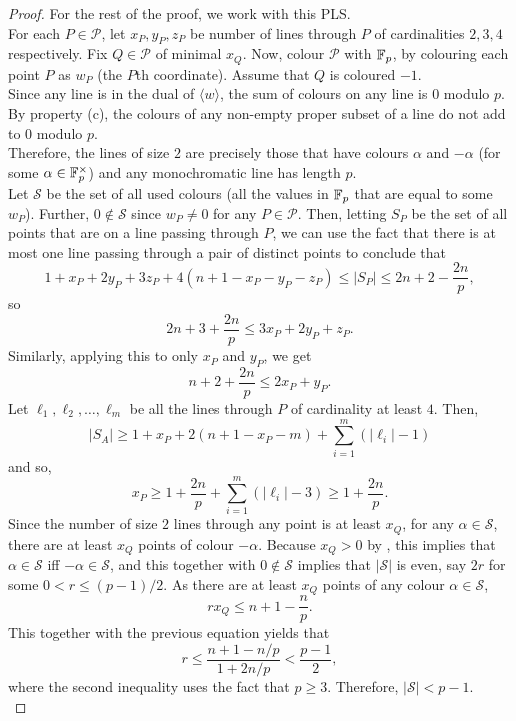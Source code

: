 \begin{proof}
		For the rest of the proof, we work with this PLS.\\
		For each $P \in \mathcal{P}$, let $x_P,y_P,z_P$ be number of lines through $P$ of cardinalities $2,3,4$ respectively. Fix $Q \in \mathcal{P}$ of minimal $x_Q$. Now, colour $\mathcal{P}$ with $\mathbb{F}_p$, by colouring each point $P$ as $w_P$ (the $P$th coordinate). Assume that $Q$ is coloured $-1$.\\
		Since any line is in the dual of $\langle w \rangle$, the sum of colours on any line is $0$ modulo $p$.\\
		By property (c), the colours of any non-empty proper subset of a line do not add to $0$ modulo $p$.\\
		Therefore, the lines of size $2$ are precisely those that have colours $\alpha$ and $-\alpha$ (for some $\alpha \in \mathbb{F}_p^\times$) and any monochromatic line has length $p$.\\
		Let $\mathcal{S}$ be the set of all used colours (all the values in $\mathbb{F}_p$ that are equal to some $w_P$). Further, $0 \not\in \mathcal{S}$ since $w_P \ne 0$ for any $P \in \mathcal{P}$. Then, letting $S_P$ be the set of all points that are on a line passing through $P$, we can use the fact that there is at most one line passing through a pair of distinct points to conclude that
		\[ 1 + x_P + 2 y_P + 3 z_P + 4(n+1 - x_P - y_P - z_P) \le |S_P| \le 2n+2-\frac{2n}{p}, \]
		so
		\begin{equation}
			\label{eqn: xP yP zP joint bound}
			2n+3+\frac{2n}{p} \le 3 x_P + 2 y_P + z_P.
		\end{equation}
		Similarly, applying this to only $x_P$ and $y_P$, we get
		\begin{equation}
			\label{eqn: xP yP joint bound}
			n+2+\frac{2n}{p} \le 2x_P + y_P.
		\end{equation}
		Let $\ell_1,\ell_2,\ldots,\ell_m$ be all the lines through $P$ of cardinality at least $4$. Then,
		\[ |S_A| \ge 1 + x_P + 2(n+1 - x_P - m) + \sum_{i = 1}^{m} (|\ell_i| - 1) \]
		and so,
		\begin{equation}
			\label{eqn: xP line bound}
			x_P \ge 1 + \frac{2n}{p} + \sum_{i=1}^{m} (|\ell_i| - 3) \ge 1 + \frac{2n}{p}.	
		\end{equation}
		Since the number of size $2$ lines through any point is at least $x_Q$, for any $\alpha \in \mathcal{S}$, there are at least $x_Q$ points of colour $-\alpha$. Because $x_Q > 0$ by , this implies that $\alpha \in \mathcal{S}$ iff $-\alpha \in \mathcal{S}$, and this together with $0 \not\in \mathcal{S}$ implies that $|\mathcal{S}|$ is even, say $2r$ for some $0 < r \le (p-1)/2$. As there are at least $x_Q$ points of any colour $\alpha \in \mathcal{S}$,
		\begin{equation}
			\label{eqn: xQ bound}
			r x_Q \le n + 1 - \frac{n}{p}.	
		\end{equation}
		This together with the previous equation yields that
		\[ r \le \frac{n+1 - n/p}{1 + 2n/p} < \frac{p-1}{2}, \]
		where the second inequality uses the fact that $p \ge 3$. Therefore, $|\mathcal{S}| < p-1$.\\



\end{proof}
